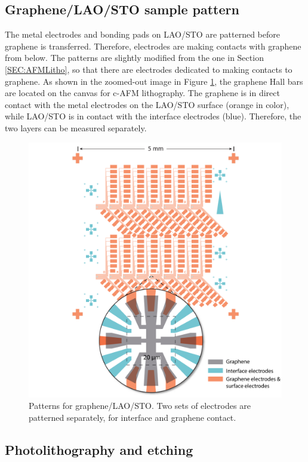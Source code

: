 \documentclass[pdflatex, sectionletters, 12pt, final, phd]{pittetd}    %
\begin{document}
\subsection{Graphene/LAO/STO sample pattern}

The metal electrodes and bonding pads on LAO/STO are patterned before graphene is transferred. Therefore, electrodes are making contacts with graphene from below. The patterns are slightly modified from the one in Section \ref{SEC:AFMLitho}, so that there are electrodes dedicated to making contacts to graphene. As shown in the zoomed-out image in Figure \ref{FIG:GCO}, the graphene Hall bars are located on the canvas for c-AFM lithography. The graphene is in direct contact with the metal electrodes on the LAO/STO surface (orange in color), while LAO/STO is in contact with the interface electrodes (blue). Therefore, the two layers can be measured separately. 

\begin{figure}[p]
	\centering
	\includegraphics[width=1\textwidth]{Drawing/GCO.pdf}
	\caption[Patterns for graphene/LAO/STO]{Patterns for graphene/LAO/STO. Two sets of electrodes are patterned separately, for interface and graphene contact.}
	\label{FIG:GCO}
\end{figure}

\subsection{Photolithography and etching}
\end{document}

